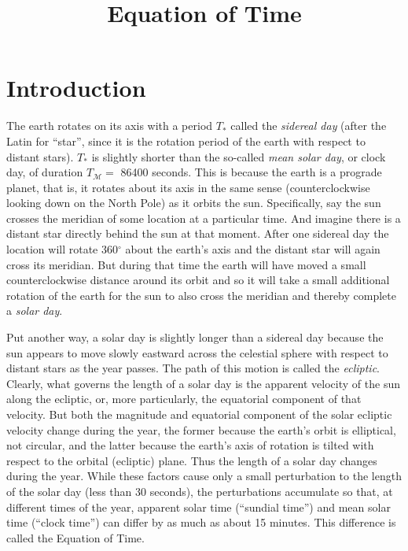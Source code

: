 \documentclass[]{AGUJournal}
\newcommand{\mqsun}{{\mathcal{M}}}
\newcommand{\Tsid}{T_*}
\newcommand{\Tmsol}{T_\mqsun}
\begin{document}
\title{Equation of Time}




\section{Introduction}

The earth rotates on its axis with a period $\Tsid$ called the {\em sidereal day} (after the Latin for ``star'', since it is the rotation period 
of the earth with respect to distant stars). $\Tsid$ is slightly shorter than the so-called {\em mean solar day}, or clock day, of duration 
$\Tmsol =$ 86400 seconds. This is because the earth is a prograde planet, that is, it rotates about its axis in the same sense 
(counterclockwise looking down on the North Pole) as it orbits the sun. Specifically, say the sun crosses the meridian of some location 
at a particular time. And imagine there is a distant star directly behind the sun at that moment. After one sidereal day the location will 
rotate 360$^\circ$ about the earth's axis and the distant star will again cross its meridian. But during that time the earth will have 
moved a small counterclockwise  distance around its orbit and so it will take a small additional rotation of the earth for the sun to also 
cross the meridian and thereby complete a {\em solar day}.

Put another way, a solar day is slightly longer than a sidereal day because the sun appears to move slowly eastward across the 
celestial sphere with respect to distant stars as the year passes. The path of this motion is called the {\em ecliptic}. Clearly, what 
governs the length of a solar day is the apparent velocity of the sun along the ecliptic, or, more particularly, the equatorial component 
of that velocity. But both the magnitude and equatorial component of the solar ecliptic velocity change during the year, the former 
because the earth's orbit is elliptical, not circular, and the latter because the earth's axis of rotation is tilted with respect to the orbital 
(ecliptic) plane. Thus the length of a solar day changes during the year. While these factors cause only a small perturbation to the 
length of the solar day (less than 30 seconds), the perturbations accumulate so that, at different times of the year, apparent solar time 
(``sundial time'') and mean solar time (``clock time'') can differ by as much as about 15 minutes. This difference is called the Equation 
of Time.
\end{document}
